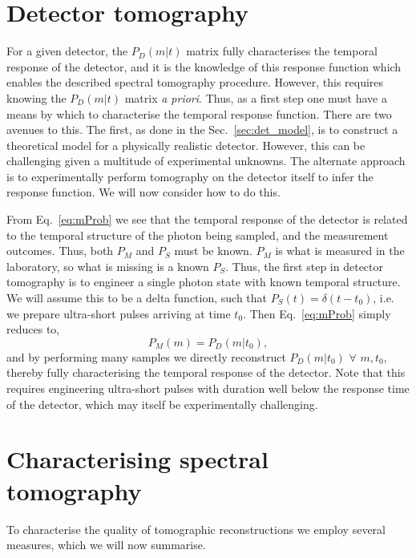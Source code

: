 \documentclass[aps,pra,twocolumn,amsmath,amssymb,color,superscriptaddress]{revtex4}
\begin{document}
%
%

\section{Detector tomography}

For a given detector, the $P_D(m|t)$ matrix fully characterises the temporal response of the detector, and it is the knowledge of this response function which enables the described spectral tomography procedure. However, this requires knowing the $P_D(m|t)$ matrix \emph{a priori}. Thus, as a first step one must have a means by which to characterise the temporal response function. There are two avenues to this. The first, as done in the Sec.~\ref{sec:det_model}, is to construct a theoretical model for a physically realistic detector. However, this can be challenging given a multitude of experimental unknowns. The alternate approach is to experimentally perform tomography on the detector itself to infer the response function. We will now consider how to do this.

From Eq.~\ref{eq:mProb} we see that the temporal response of the detector is related to the temporal structure of the photon being sampled, and the measurement outcomes. Thus, both $P_M$ and $P_S$ must be known. $P_M$ is what is measured in the laboratory, so what is missing is a known $P_S$. Thus, the first step in detector tomography is to engineer a single photon state with known temporal structure. We will assume this to be a delta function, such that \mbox{$P_S(t)=\delta(t-t_0)$}, i.e. we prepare ultra-short pulses arriving at time $t_0$. Then Eq.~\ref{eq:mProb} simply reduces to,
\begin{equation}
P_M(m) = P_D(m|t_0),
\end{equation}
and by performing many samples we directly reconstruct \mbox{$P_D(m|t_0) \,\,\forall \,\, m,t_0$}, thereby fully characterising the temporal response of the detector. Note that this requires engineering ultra-short pulses with duration well below the response time of the detector, which may itself be experimentally challenging.

%
%

\section{Characterising spectral tomography}

To characterise the quality of tomographic reconstructions we employ several measures, which we will now summarise.
\end{document}
